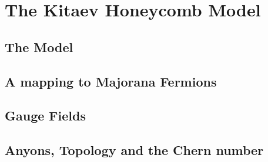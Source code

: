 \hypertarget{the-kitaev-honeycomb-model}{%
\section{The Kitaev Honeycomb Model}\label{the-kitaev-honeycomb-model}}

\hypertarget{the-model}{%
\subsection{The Model}\label{the-model}}

\hypertarget{a-mapping-to-majorana-fermions}{%
\subsection{A mapping to Majorana Fermions}\label{a-mapping-to-majorana-fermions}}

\hypertarget{gauge-fields}{%
\subsection{Gauge Fields}\label{gauge-fields}}

\hypertarget{anyons-topology-and-the-chern-number}{%
\subsection{Anyons, Topology and the Chern number}\label{anyons-topology-and-the-chern-number}}

\begin{Shaded}
\begin{Highlighting}[]

\end{Highlighting}
\end{Shaded}
